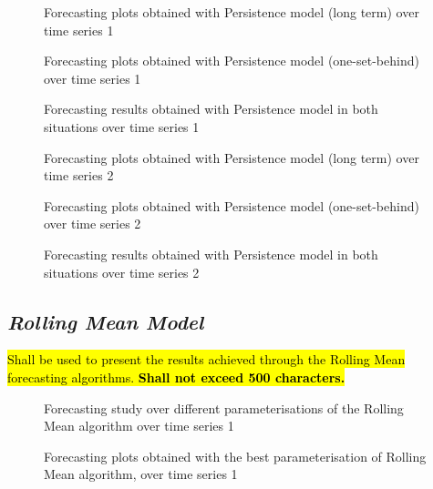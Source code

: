 \documentclass[10pt]{extarticle}
\newcommand{\ctext}[3][RGB]{%
  \begingroup
  \definecolor{hlcolor}{#1}{#2}\sethlcolor{hlcolor}%
  \hl{#3}%
  \endgroup
}
\begin{document}
\begin{figure}[H]
\caption{Forecasting plots obtained with Persistence model (long term) over time series 1}
\end{figure}

\begin{figure}[H]
\caption{Forecasting plots obtained with Persistence model (one-set-behind) over time series 1}
\end{figure}

\begin{figure}[H]
\caption{Forecasting results obtained with Persistence model in both situations over time series 1}
\end{figure}

\begin{figure}[H]
\caption{Forecasting plots obtained with Persistence model (long term) over time series 2}
\end{figure}

\begin{figure}[H]
\caption{Forecasting plots obtained with Persistence model (one-set-behind) over time series 2}
\end{figure}

\begin{figure}[H]
\caption{Forecasting results obtained with Persistence model in both situations over time series 2}
\end{figure}

\subsection*{\textit{Rolling Mean Model}}
\ctext[RGB]{190,190,190}{Shall be used to present the results achieved through the Rolling Mean forecasting algorithms.  \textbf{Shall not exceed 500 characters.}}

\begin{figure}[H]
\caption{Forecasting study over different parameterisations of the Rolling Mean algorithm over time series 1}
\end{figure}

\begin{figure}[H]
\caption{Forecasting plots obtained with the best parameterisation of Rolling Mean algorithm, over time series 1}
\end{figure}
\end{document}
